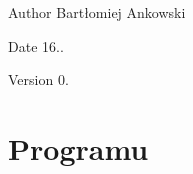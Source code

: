 \begin{DoxyAuthor}{Author}
Bartłomiej Ankowski 
\end{DoxyAuthor}
\begin{DoxyDate}{Date}
16.. 
\end{DoxyDate}
\begin{DoxyVersion}{Version}
0. \par

\end{DoxyVersion}
\hypertarget{index_Opis}{}\section{Programu}\label{index_Opis}
